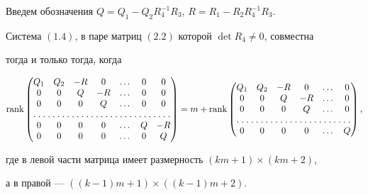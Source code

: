  


Введем обозначения $Q=Q_1-Q_2R^{-1}_4R_3$, $R=R_1-R_2R^{-1}_4R_3$. 


 


 


\begin{thms} 


Система $(1.4)$, в паре матриц $(2.2)$ которой $\det R_4\ne0$, совместна 


тогда и только тогда, когда 


\begin{equation} 


\rank 


\begin{pmatrix} 


Q_1 & Q_2 & -R & 0 & \dotsc & 0 & 0 \\ 


0 & 0 & Q & -R & \dotsc & 0 & 0 \\ 


0 & 0 & 0 & Q & \dotsc & 0 & 0 \\ 


\hdotsfor[1.5]{7} \\


0 & 0 & 0 & 0 & \dotsc & Q & -R\\ 


0 & 0 & 0 & 0 & \dotsc & 0 & Q 


\end{pmatrix} 


=m+\rank 


\begin{pmatrix} 


Q_1 & Q_2 & -R & 0 & \dotsc & 0 \\ 


0 & 0 & Q & -R & \dotsc & 0 \\ 


0 & 0 & 0 & Q & \dotsc & 0 \\ 


\hdotsfor[1.5]{6} \\


0 & 0 & 0 & 0 & \dotsc & Q 


\end{pmatrix} 


, 


\end{equation} 


где в левой части матрица имеет размерность $(km{+}1)\times (km{+}2)$,


а в правой --- $((k{-}1)m+1)\times((k-1)m+2)$. 


\end{thms} 


